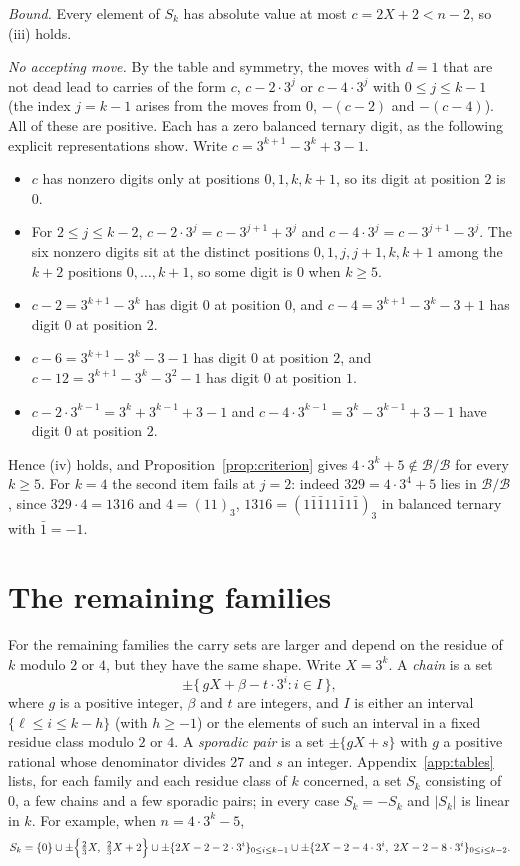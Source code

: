 \documentclass[11pt]{amsart}
\theoremstyle{definition}
\newcommand{\B}{\mathcal{B}}
\begin{document}
\medskip\noindent\emph{Bound.} Every element of $S_k$ has absolute value at most $c=2X+2<n-2$, so (iii)
holds.

\medskip\noindent\emph{No accepting move.} By the table and symmetry, the moves with $d=1$ that are not
dead lead to carries of the form $c$, $c-2\cdot 3^j$ or $c-4\cdot 3^j$ with $0\le j\le k-1$ (the
index $j=k-1$ arises from the moves from $0$, $-(c-2)$ and $-(c-4)$). All of these are positive. Each has a zero
balanced ternary digit, as the following explicit representations show. Write
$c=3^{k+1}-3^k+3-1$.
\begin{itemize}
\item $c$ has nonzero digits only at positions $0,1,k,k+1$, so its digit at position $2$ is $0$.
\item For $2\le j\le k-2$, $c-2\cdot 3^j=c-3^{j+1}+3^j$ and $c-4\cdot 3^j=c-3^{j+1}-3^j$. The six
nonzero digits sit at the distinct positions $0,1,j,j+1,k,k+1$ among the $k+2$ positions
$0,\dots,k+1$, so some digit is $0$ when $k\ge 5$.
\item $c-2=3^{k+1}-3^k$ has digit $0$ at position $0$, and $c-4=3^{k+1}-3^k-3+1$ has digit $0$ at
position $2$.
\item $c-6=3^{k+1}-3^k-3-1$ has digit $0$ at position $2$, and $c-12=3^{k+1}-3^k-3^2-1$ has digit $0$
at position $1$.
\item $c-2\cdot 3^{k-1}=3^k+3^{k-1}+3-1$ and $c-4\cdot 3^{k-1}=3^k-3^{k-1}+3-1$ have digit $0$ at
position $2$.
\end{itemize}
Hence (iv) holds, and Proposition~\ref{prop:criterion} gives $4\cdot 3^k+5\notin\B/\B$ for every
$k\ge 5$. For $k=4$ the second item fails at $j=2$: indeed $329=4\cdot 3^4+5$ lies in $\B/\B$, since
$329\cdot 4=1316$ and $4=(11)_3$, $1316=(1\bar1\bar1 11\bar1 1\bar1)_3$ in balanced ternary with
$\bar1=-1$.

\section{The remaining families}\label{sec:others}

For the remaining families the carry sets are larger and depend on the residue of $k$ modulo $2$ or
$4$, but they have the same shape. Write $X=3^k$. A \emph{chain} is a set
\[
\pm\{\,gX+\beta-t\cdot 3^i : i\in I\,\},
\]
where $g$ is a positive integer, $\beta$ and $t$ are integers, and $I$ is either an interval
$\{\ell\le i\le k-h\}$ (with $h\ge -1$) or the elements of such an interval in a fixed residue
class modulo $2$ or $4$. A \emph{sporadic pair} is a set $\pm\{gX+s\}$ with $g$ a positive rational
whose denominator divides $27$ and $s$ an integer. Appendix~\ref{app:tables} lists, for each family
and each residue class of $k$ concerned, a
set $S_k$ consisting of $0$, a few chains and a few sporadic pairs; in every case $S_k=-S_k$ and
$|S_k|$ is linear in $k$. For example, when $n=4\cdot 3^k-5$,
\[
S_k=\{0\}\cup\pm\Bigl\{\tfrac23X,\ \tfrac23X+2\Bigr\}\cup
\pm\{2X-2-2\cdot 3^i\}_{0\le i\le k-1}\cup\pm\{2X-2-4\cdot 3^i,\ 2X-2-8\cdot 3^i\}_{0\le i\le k-2}.
\]
\end{document}
